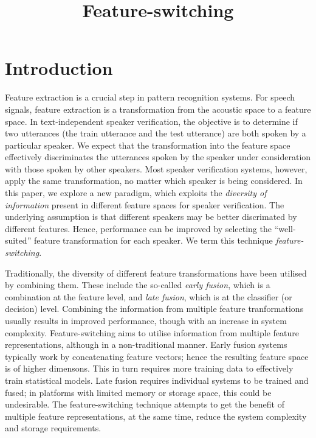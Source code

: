 \documentclass{article}
\title{Feature-switching}
\begin{document}
\section{Introduction}
Feature extraction is a crucial step in pattern recognition systems. For
speech signals, feature extraction is a transformation from the acoustic space
to a feature space. In text-independent speaker verification, the objective is
to determine if two utterances (the train utterance and the test utterance) are
both spoken by a particular speaker. We expect that the transformation into the
feature space effectively discriminates the utterances spoken by the speaker
under consideration with those spoken by other speakers. Most speaker
verification systems, however, apply the same transformation, no matter which
speaker is being considered. In this paper, we explore a new paradigm, which
exploits the \emph{diversity of information} present in different feature spaces
for speaker verification. The underlying assumption is that different speakers
may be better discrimated by different features. Hence, performance can
be improved by selecting the ``well-suited'' feature transformation for
each speaker. We term this technique \emph{feature-switching}. 

Traditionally, the diversity of different feature transformations have been
utilised by combining them. These include the so-called \emph{early fusion},
which is a combination at the feature level, and \emph{late fusion}, which is at
the classifier (or decision) level. Combining the information from multiple
feature tranformations usually results in improved performance, though
with an increase in system complexity. Feature-switching aims to utilise
information from multiple feature representations, although in a non-traditional
manner. Early fusion systems typically work by concatenating feature vectors;
hence the resulting feature space is of higher dimensons. This in turn requires
more training data to effectively train statistical models. Late fusion requires
individual systems to be trained and fused; in platforms with limited memory or
storage space, this could be undesirable. The feature-switching technique
attempts to get the benefit of multiple feature representations, at the same
time, reduce the system complexity and storage requirements.
\end{document}
